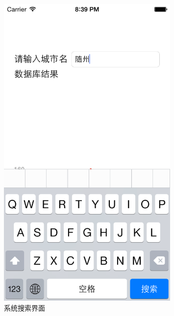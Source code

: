 \documentclass[UTF8,nofonts]{ctexart}
\begin{document}
\begin{figure}[hbt]
\centering
\includegraphics[width=0.8\textwidth]{8.png}
\caption{系统搜索界面}
\end{figure}
\end{document}
